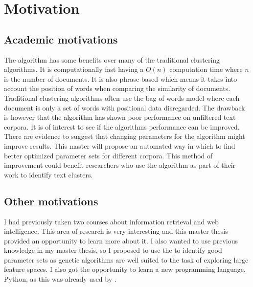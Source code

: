 
\section{Motivation}
\subsection{Academic motivations}

The \STC algorithm has some benefits over many of the traditional clustering algorithms. It is computationally fast having a \(O(n)\) computation time where \(n\) is the number of documents. It is also phrase based which means it takes into account the position of words when comparing the similarity of documents. Traditional clustering algorithms often use the bag of words model where each document is only a set of words with positional data disregarded. The drawback is however that the \STC algorithm has shown poor performance on unfiltered text corpora. It is of interest to see if the algorithms performance can be improved. There are evidence to suggest that changing parameters for the algorithm might improve results. This master will propose an automated way in which to find better optimized parameter sets for different corpora. This method of improvement could benefit researchers who use the algorithm as part of their work to identify text clusters.

\subsection{Other motivations}
I had previously taken two courses about information retrieval and web intelligence. This area of research is very interesting and this master thesis provided an opportunity to learn more about it. I also wanted to use previous knowledge in my master thesis, so I proposed to use the \GA to identify good parameter sets as genetic algorithms are well suited to the task of exploring large feature spaces. I also got the opportunity to learn a new programming language, Python, as this was already used by \supervisor.


